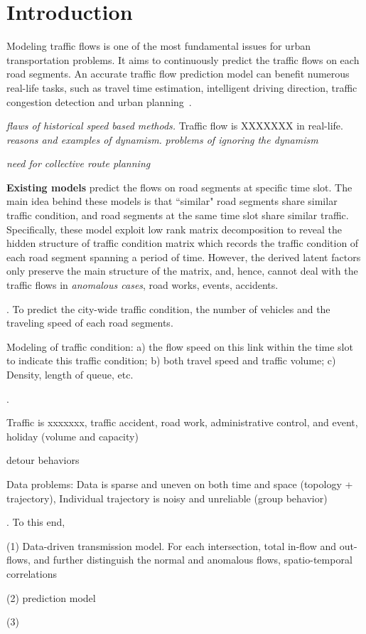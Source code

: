 \section{Introduction}
\label{sec-intro}

Modeling traffic flows is one of the most fundamental issues for urban transportation problems. It aims to continuously predict the traffic flows on each road segments. An accurate traffic flow prediction model can benefit numerous real-life tasks, such as travel time estimation, intelligent driving direction, traffic congestion detection and urban planning~\cite{Zheng2014TIST}.


{\em flaws of historical speed based methods.} Traffic flow is XXXXXXX in real-life. {\em reasons and examples of dynamism.} {\em problems of ignoring the dynamism}

{\em need for collective route planning}

{\bf Existing models} predict the flows on road segments at specific time slot. The main idea behind these models is that ``similar" road segments share similar traffic condition, and road segments at the same time slot share similar traffic. Specifically, these model exploit low rank matrix decomposition to reveal the hidden structure of traffic condition matrix which records the traffic condition of each road segment spanning a period of time. However, the derived latent factors only preserve the main structure of the matrix, and, hence, cannot deal with the traffic flows in {\em anomalous cases}, \eg road works, events, accidents.

. To predict the city-wide traffic condition, \ie the number of vehicles and the traveling speed of each road segments.

Modeling of traffic condition:
a)	the flow speed on this link within the time slot to indicate this traffic condition;
b)	both travel speed and traffic volume;
c)	Density, length of queue, etc.

.
\bi
\item Traffic is xxxxxxx, \eg traffic accident, road work, administrative control, and event, holiday (volume and capacity)
\item detour behaviors
\item Data problems: Data is sparse and uneven on both time and space (topology + trajectory), Individual trajectory is noisy and unreliable (group behavior)
\ei

. To this end,

\ni (1) Data-driven transmission model. For each intersection, total in-flow and out-flows, and further distinguish the normal and anomalous flows, spatio-temporal correlations

\ni (2) prediction model

\ni (3)


